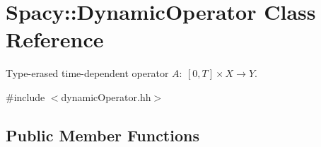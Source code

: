 \hypertarget{classSpacy_1_1DynamicOperator}{\section{\-Spacy\-:\-:\-Dynamic\-Operator \-Class \-Reference}
\label{classSpacy_1_1DynamicOperator}
}


\-Type-\/erased time-\/dependent operator $A:\ [0,T] \times X \to Y $.  




{\ttfamily \#include $<$dynamic\-Operator.\-hh$>$}

\subsection*{\-Public \-Member \-Functions}
